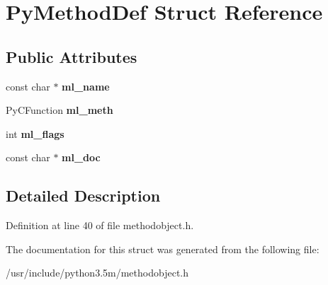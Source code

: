 \hypertarget{structPyMethodDef}{}\section{Py\+Method\+Def Struct Reference}
\label{structPyMethodDef}
\subsection*{Public Attributes}
\begin{DoxyCompactItemize}
\item 
const char $\ast$ {\bfseries ml\+\_\+name}\hypertarget{structPyMethodDef_a308a3fcf53e3b75685ed2ebf11cf77de}{}\label{structPyMethodDef_a308a3fcf53e3b75685ed2ebf11cf77de}

\item 
Py\+C\+Function {\bfseries ml\+\_\+meth}\hypertarget{structPyMethodDef_a2e99fd743a714b893d8735951000449e}{}\label{structPyMethodDef_a2e99fd743a714b893d8735951000449e}

\item 
int {\bfseries ml\+\_\+flags}\hypertarget{structPyMethodDef_a05f3ccbdc28b4ddf5a0a63e6c41b0e8c}{}\label{structPyMethodDef_a05f3ccbdc28b4ddf5a0a63e6c41b0e8c}

\item 
const char $\ast$ {\bfseries ml\+\_\+doc}\hypertarget{structPyMethodDef_a1959e75fa6c0ad603b1f54ca97a01212}{}\label{structPyMethodDef_a1959e75fa6c0ad603b1f54ca97a01212}

\end{DoxyCompactItemize}


\subsection{Detailed Description}


Definition at line 40 of file methodobject.\+h.



The documentation for this struct was generated from the following file\+:\begin{DoxyCompactItemize}
\item 
/usr/include/python3.\+5m/methodobject.\+h\end{DoxyCompactItemize}
